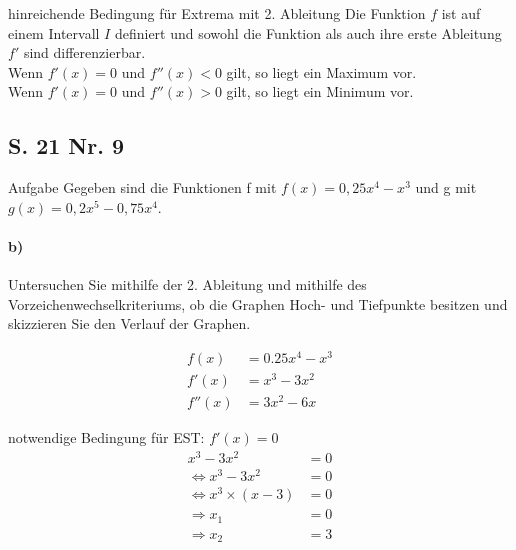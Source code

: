 \documentclass[arbeitsmappe.tex]{subfiles}
\begin{document}
    \begin{gblock}{hinreichende Bedingung für Extrema mit 2. Ableitung}
        Die Funktion $f$ ist auf einem Intervall $I$ definiert und sowohl die Funktion als auch ihre erste Ableitung $f'$ sind differenzierbar. \\
        Wenn $f'(x) = 0$ und $f''(x) < 0$ gilt, so liegt ein Maximum vor. \\
        Wenn $f'(x) = 0$ und $f''(x) > 0$ gilt, so liegt ein Minimum vor. \\
    \end{gblock}

    \subsection{S. 21 Nr. 9}
    \begin{rblock}{Aufgabe}
        Gegeben sind die Funktionen f mit $f(x) = 0,25x^4 - x^3$ und g mit $g(x) = 0,2x^5 - 0,75x^4$. \\

        \paragraph{b)} Untersuchen Sie mithilfe der 2. Ableitung und mithilfe des Vorzeichenwechselkriteriums, ob die Graphen Hoch- und Tiefpunkte besitzen und skizzieren Sie den Verlauf der Graphen.
    \end{rblock}

    \begin{align*}
        f(x) &= 0.25x^4 - x^3 \\
        f'(x) &= x^3 - 3x^2 \\
        f''(x) &= 3x^2 - 6x
    \end{align*}

    notwendige Bedingung für EST: $f'(x) = 0$ \\
    \begin{align*}
        x^3 - 3x^2 &= 0 \\
        \Leftrightarrow x^3 - 3x^2 &= 0 \\
        \Leftrightarrow x^3 \times (x-3) &= 0 \\
        \Rightarrow x_1 &= 0 \\
        \Rightarrow x_2 &= 3
    \end{align*}
\end{document}

